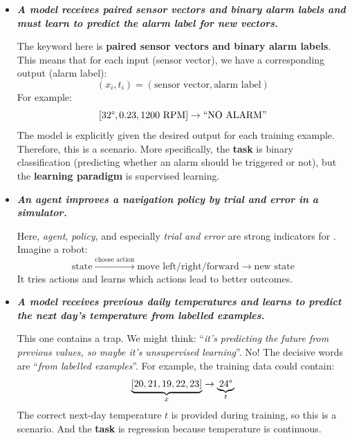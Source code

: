 \begin{itemize}
    \item[\textbf{S.}] \textcolor{Green3}{\textbf{\emph{A model receives paired sensor vectors and binary alarm labels and must learn to predict the alarm label for new vectors.}}}

        The keyword here is \textbf{paired sensor vectors and binary alarm labels}. This means that for each input (sensor vector), we have a corresponding output (alarm label):
        \begin{equation*}
            (x_i, t_i) = \left(\text{sensor vector}, \text{alarm label}\right)
        \end{equation*}
        For example:
        \begin{equation*}
            \left[32\degree, 0.23, 1200\text{ RPM}\right] \to \text{``NO ALARM''}
        \end{equation*}
        The model is explicitly given the desired output for each training example. Therefore, this is a  scenario. More specifically, the \textbf{task} is binary classification (predicting whether an alarm should be triggered or not), but the \textbf{learning paradigm} is supervised learning.

    \item[\textbf{RL.}] \textcolor{Green3}{\textbf{\emph{An agent improves a navigation policy by trial and error in a simulator.}}}

        Here, \emph{agent}, \emph{policy}, and especially \emph{trial and error} are strong indicators for . Imagine a robot:
        \begin{equation*}
            \text{state} \xrightarrow{\text{choose action}} \text{move left/right/forward} \to \text{new state}
        \end{equation*}
        It tries actions and learns which actions lead to better outcomes.

    \item[\textbf{S.}] \textcolor{Green3}{\textbf{\emph{A model receives previous daily temperatures and learns to predict the next day's temperature from labelled examples.}}}

        This one contains a trap. We might think: ``\emph{it's predicting the future from previous values, so maybe it's unsupervised learning}''. No! The decisive words are ``\emph{from labelled examples}''. For example, the training data could contain:
        \begin{equation*}
            \underbrace{\left[20, 21, 19, 22, 23\right]}_{x} \to \underbrace{24\degree}_{t}
        \end{equation*}
        The correct next-day temperature $t$ is provided during training, so this is a  scenario. And the \textbf{task} is regression because temperature is continuous.


\end{itemize}
